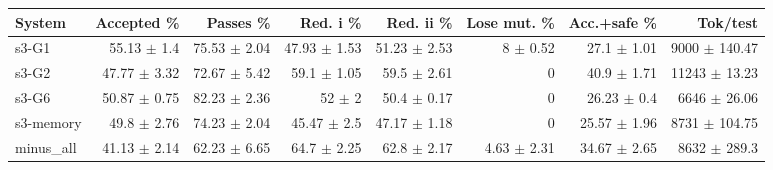 \begin{tabular}{lrrrrrrr}
\toprule
System & Accepted \% & Passes \% & Red. i \% & Red. ii \% & Lose mut. \% & Acc.+safe \% & Tok/test \\
\midrule
s3-G1 & 55.13 $\pm$ 1.4 & 75.53 $\pm$ 2.04 & 47.93 $\pm$ 1.53 & 51.23 $\pm$ 2.53 & 8 $\pm$ 0.52 & 27.1 $\pm$ 1.01 & 9000 $\pm$ 140.47 \\
s3-G2 & 47.77 $\pm$ 3.32 & 72.67 $\pm$ 5.42 & 59.1 $\pm$ 1.05 & 59.5 $\pm$ 2.61 & 0 & 40.9 $\pm$ 1.71 & 11243 $\pm$ 13.23 \\
s3-G6 & 50.87 $\pm$ 0.75 & 82.23 $\pm$ 2.36 & 52 $\pm$ 2 & 50.4 $\pm$ 0.17 & 0 & 26.23 $\pm$ 0.4 & 6646 $\pm$ 26.06 \\
s3-memory & 49.8 $\pm$ 2.76 & 74.23 $\pm$ 2.04 & 45.47 $\pm$ 2.5 & 47.17 $\pm$ 1.18 & 0 & 25.57 $\pm$ 1.96 & 8731 $\pm$ 104.75 \\
minus_all & 41.13 $\pm$ 2.14 & 62.23 $\pm$ 6.65 & 64.7 $\pm$ 2.25 & 62.8 $\pm$ 2.17 & 4.63 $\pm$ 2.31 & 34.67 $\pm$ 2.65 & 8632 $\pm$ 289.3 \\
\bottomrule
\end{tabular}
